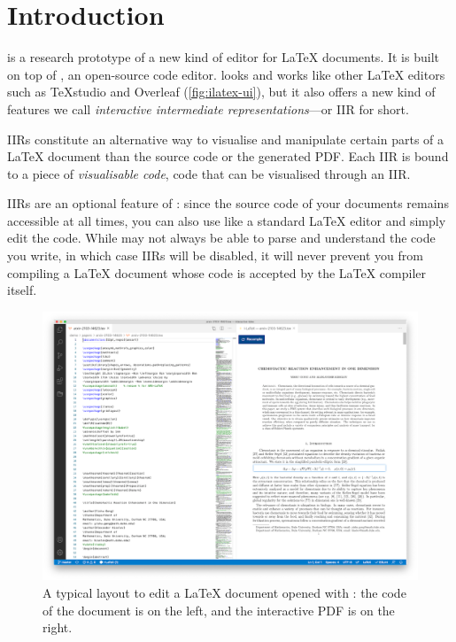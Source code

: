 \section{Introduction}
\iLaTeX{} is a research prototype of a new kind of editor for \LaTeX{} documents.
It is built on top of \vsc, an open-source code editor.
\iLaTeX{} looks and works like other \LaTeX{} editors such as TeXstudio and Overleaf (\autoref{fig:ilatex-ui}), but it also offers a new kind of features we call \emph{interactive intermediate representations}---or IIR for short.

IIRs constitute an alternative way to visualise and manipulate certain parts of a \LaTeX{} document than the source code or the generated PDF.
Each IIR is bound to a piece of \emph{visualisable code}, \ie code that can be visualised through an IIR.

IIRs are an optional feature of \iLaTeX{}: since the source code of your documents remains accessible at all times, you can also use \iLaTeX{} like a standard \LaTeX{} editor and simply edit the code.
While \iLaTeX{} may not always be able to parse and understand the code you write, in which case IIRs will be disabled, it will never prevent you from compiling a \LaTeX{} document whose code is accepted by the \LaTeX{} compiler itself.

\begin{figure}[h]
    \centering
    \includegraphics[width = \textwidth]{img/ilatex-editor-ui.png}
    \caption{A typical layout to edit a \LaTeX{} document opened with \iLaTeX{}: the code of the document is on the left, and the interactive PDF is on the right.}
    \label{fig:ilatex-ui}
\end{figure}